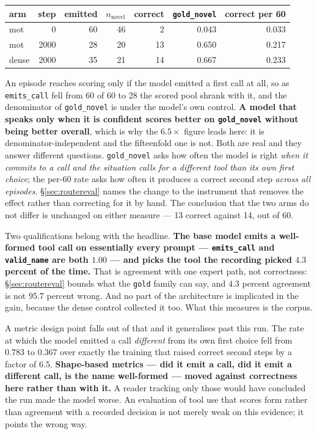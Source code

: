\documentclass[11pt]{article}
\begin{document}
\begin{center}
\begin{tabular}{@{}lrrrrrr@{}}
\toprule
arm & step & emitted & $n_{\mathrm{novel}}$ & correct & \texttt{gold\_novel} & correct per 60 \\
\midrule
mot   & 0    & 60 & 46 & 2  & 0.043 & 0.033 \\
mot   & 2000 & 28 & 20 & 13 & 0.650 & 0.217 \\
dense & 2000 & 35 & 21 & 14 & 0.667 & 0.233 \\
\bottomrule
\end{tabular}
\end{center}

An episode reaches scoring only if the model emitted a first call at all, so as \texttt{emits\_call} fell from 60 of 60 to 28 the scored pool shrank with it, and the denominator of \texttt{gold\_novel} is under the model's own control. \textbf{A model that speaks only when it is confident scores better on \texttt{gold\_novel} without being better overall}, which is why the $6.5\times$ figure leads here: it is denominator-independent and the fifteenfold one is not. Both are real and they answer different questions. \texttt{gold\_novel} asks how often the model is right \emph{when it commits to a call and the situation calls for a different tool than its own first choice}; the per-60 rate asks how often it produces a correct second step \emph{across all episodes}. \S\ref{sec:routereval} names the change to the instrument that removes the effect rather than correcting for it by hand. The conclusion that the two arms do not differ is unchanged on either measure --- 13 correct against 14, out of 60.

Two qualifications belong with the headline. \textbf{The base model emits a well-formed tool call on essentially every prompt --- \texttt{emits\_call} and \texttt{valid\_name} are both $1.00$ --- and picks the tool the recording picked $4.3$ percent of the time.} That is agreement with one expert path, not correctness: \S\ref{sec:routereval} bounds what the \texttt{gold} family can say, and $4.3$ percent agreement is not $95.7$ percent wrong. And no part of the architecture is implicated in the gain, because the dense control collected it too. What this measures is the corpus.

A metric design point falls out of that and it generalises past this run. The rate at which the model emitted a call \emph{different} from its own first choice fell from $0.783$ to $0.367$ over exactly the training that raised correct second steps by a factor of $6.5$. \textbf{Shape-based metrics --- did it emit a call, did it emit a different call, is the name well-formed --- moved against correctness here rather than with it.} A reader tracking only those would have concluded the run made the model worse. An evaluation of tool use that scores form rather than agreement with a recorded decision is not merely weak on this evidence; it points the wrong way.
\end{document}
